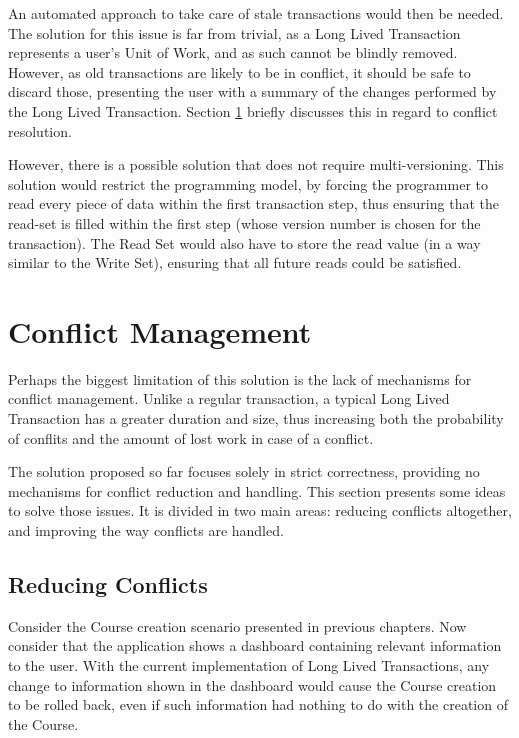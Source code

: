 An automated approach to take care of stale transactions would then be
needed. The solution for this issue is far from trivial, as a Long
Lived Transaction represents a user's Unit of Work, and as such cannot
be blindly removed. However, as old transactions are likely to be in
conflict, it should be safe to discard those, presenting the user with
a summary of the changes performed by the Long Lived
Transaction. Section \ref{sec:conflicts} briefly discusses this in
regard to conflict resolution.

However, there is a possible solution that does not require
multi-versioning. This solution would restrict the programming model,
by forcing the programmer to read every piece of data within the first
transaction step, thus ensuring that the read-set is filled within the
first step (whose version number is chosen for the transaction). The
Read Set would also have to store the read value (in a way similar to
the Write Set), ensuring that all future reads could be satisfied.

\section{Conflict Management}
\label{sec:conflicts}

Perhaps the biggest limitation of this solution is the lack of
mechanisms for conflict management. Unlike a regular transaction, a
typical Long Lived Transaction has a greater duration and size, thus
increasing both the probability of conflits and the amount of lost
work in case of a conflict.

The solution proposed so far focuses solely in strict correctness,
providing no mechanisms for conflict reduction and handling. This
section presents some ideas to solve those issues. It is divided in
two main areas: reducing conflicts altogether, and improving the way
conflicts are handled.

\subsection{Reducing Conflicts}

Consider the Course creation scenario presented in previous
chapters. Now consider that the application shows a dashboard
containing relevant information to the user. With the current
implementation of Long Lived Transactions, any change to information
shown in the dashboard would cause the Course creation to be rolled
back, even if such information had nothing to do with the creation of
the Course.

